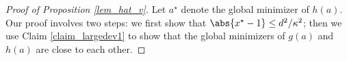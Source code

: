 \documentclass[aos,preprint]{imsart}
\begin{document}
\begin{proof}[Proof of Proposition \ref{lem_hat_v}]
Let $a^{\star}$ denote the global minimizer of $h(a)$. Our proof involves two steps: we first show that $\abs{x^{\star} - 1} \le d^2 / \kappa^2$; then we use Claim \ref{claim_largedev1} to show that the global minimizers of $g(a)$ and $h(a)$ are close to each other.




\end{proof}
\end{document}
